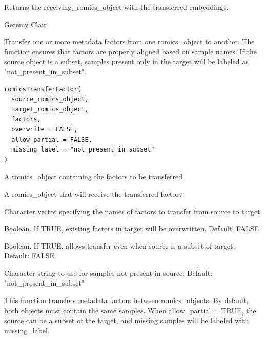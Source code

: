 \documentclass[a4paper]{book}
\begin{document}
%
\begin{Value}
Returns the receiving\_romics\_object with the transferred embeddings.
\end{Value}
%
\begin{Author}
Geremy Clair
\end{Author}
%
\begin{Description}
Transfer one or more metadata factors from one romics\_object to another.
The function ensures that factors are properly aligned based on sample names.
If the source object is a subset, samples present only in the target will be
labeled as "not\_present\_in\_subset".
\end{Description}
%
\begin{Usage}
\begin{verbatim}
romicsTransferFactor(
  source_romics_object,
  target_romics_object,
  factors,
  overwrite = FALSE,
  allow_partial = FALSE,
  missing_label = "not_present_in_subset"
)
\end{verbatim}
\end{Usage}
%
\begin{Arguments}
\begin{ldescription}
\item[\code{source\_romics\_object}] A romics\_object containing the factors to be transferred

\item[\code{target\_romics\_object}] A romics\_object that will receive the transferred factors

\item[\code{factors}] Character vector specifying the names of factors to transfer from source to target

\item[\code{overwrite}] Boolean. If TRUE, existing factors in target will be overwritten. Default: FALSE

\item[\code{allow\_partial}] Boolean. If TRUE, allows transfer even when source is a subset of target. Default: FALSE

\item[\code{missing\_label}] Character string to use for samples not present in source. Default: "not\_present\_in\_subset"
\end{ldescription}
\end{Arguments}
%
\begin{Details}
This function transfers metadata factors between romics\_objects. By default, both objects
must contain the same samples. When allow\_partial = TRUE, the source can be a subset of the target,
and missing samples will be labeled with missing\_label.
\end{Details}
\end{document}
